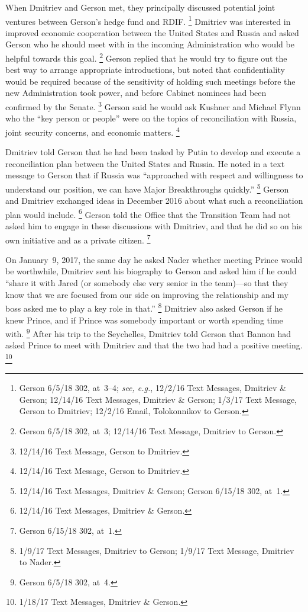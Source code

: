 When Dmitriev and Gerson met, they principally discussed potential joint ventures between Gerson's hedge fund and RDIF\null.%
\footnote{Gerson 6/5/18 302, at~3--4;
\textit{see, e.g.}, 12/2/16 Text Messages, Dmitriev \& Gerson;
12/14/16 Text Messages, Dmitriev \& Gerson;
1/3/17 Text Message, Gerson to Dmitriev;
12/2/16 Email, Tolokonnikov to Gerson.}
Dmitriev was interested in improved economic cooperation between the United States and Russia and asked Gerson who he should meet with in the incoming Administration who would be helpful towards this goal.%
\footnote{Gerson 6/5/18 302, at~3;
12/14/16 Text Message, Dmitriev to Gerson.}
Gerson replied that he would try to figure out the best way to arrange appropriate introductions, but noted that confidentiality would be required because of the sensitivity of holding such meetings before the new Administration took power, and before Cabinet nominees had been confirmed by the Senate.%
\footnote{12/14/16 Text Message, Gerson to Dmitriev.}
Gerson said he would ask Kushner and Michael Flynn who the ``key person or people'' were on the topics of reconciliation with Russia, joint security concerns, and economic matters.%
\footnote{12/14/16 Text Message, Gerson to Dmitriev.}

Dmitriev told Gerson that he had been tasked by Putin to develop and execute a reconciliation plan between the United States and Russia.
He noted in a text message to Gerson that if Russia was ``approached with respect and willingness to understand our position, we can have Major Breakthroughs quickly.''%
\footnote{12/14/16 Text Messages, Dmitriev \& Gerson;
Gerson 6/15/18 302, at~1.}
Gerson and Dmitriev exchanged ideas in December 2016 about what such a reconciliation plan would include.%
\footnote{12/14/16 Text Messages, Dmitriev \& Gerson.}
Gerson told the Office that the Transition Team had not asked him to engage in these discussions with Dmitriev, and that he did so on his own initiative and as a private citizen.%
\footnote{Gerson 6/15/18 302, at~1.}

On January~9, 2017, the same day he asked Nader whether meeting Prince would be worthwhile, Dmitriev sent his biography to Gerson and asked him if he could ``share it with Jared (or somebody else very senior in the team)---so that they know that we are focused from our side on improving the relationship and my boss asked me to play a key role in that.''%
\footnote{1/9/17 Text Messages, Dmitriev to Gerson;
1/9/17 Text Message, Dmitriev to Nader.}
Dmitriev also asked Gerson if he knew Prince, and if Prince was somebody important or worth spending time with.%
\footnote{Gerson 6/5/18 302, at~4.}
After his trip to the Seychelles, Dmitriev told Gerson that Bannon had asked Prince to meet with Dmitriev and that the two had had a positive meeting.%
\footnote{1/18/17 Text Messages, Dmitriev \& Gerson.}

